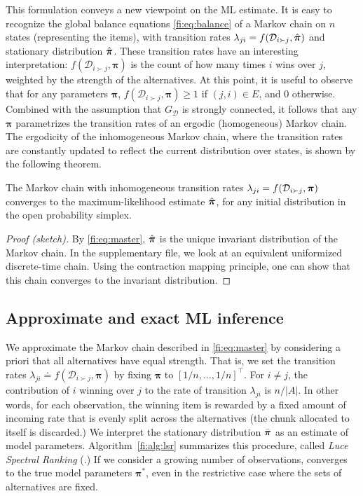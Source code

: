 This formulation conveys a new viewpoint on the ML estimate.
It is easy to recognize the global balance equations \eqref{fi:eq:balance} of a Markov chain on $n$ states (representing the items), with transition rates $\lambda_{ji} = f(\mathcal{D}_{i \succ j}, \hat{\bm{\pi}})$ and stationary distribution $\hat{\bm{\pi}}$.
These transition rates have an interesting interpretation: $f(\mathcal{D}_{i \succ j}, \bm{\pi})$ is the count of how many times $i$ wins over $j$, weighted by the strength of the alternatives.
At this point, it is useful to observe that for any parameters $\bm{\pi}$, $f(\mathcal{D}_{i \succ j}, \bm{\pi}) \ge 1$ if $(j,i) \in E$, and $0$ otherwise.
Combined with the assumption that $G_\mathcal{D}$ is strongly connected, it follows that any $\bm{\pi}$ parametrizes the transition rates of an ergodic (homogeneous) Markov chain.
The ergodicity of the inhomogeneous Markov chain, where the transition rates are constantly updated to reflect the current distribution over states, is shown by the following theorem.
\begin{theorem}
\label{fi:thm:convergence}
The Markov chain with inhomogeneous transition rates $\lambda_{ji} = f(\mathcal{D}_{i \succ j}, \bm{\pi})$ converges to the maximum-likelihood estimate $\hat{\bm{\pi}}$, for any initial distribution in the open probability simplex.
\end{theorem}

\vspace{-0.3cm}
\begin{proof}[Proof (sketch)]
By \eqref{fi:eq:master}, $\hat{\bm{\pi}}$ is the unique invariant distribution of the Markov chain.
In the supplementary file, we look at an equivalent uniformized discrete-time chain.
Using the contraction mapping principle, one can show that this chain converges to the invariant distribution.
\end{proof}


\subsection{Approximate and exact ML inference}

We approximate the Markov chain described in \eqref{fi:eq:master} by considering a priori that all alternatives have equal strength.
That is, we set the transition rates $\lambda_{ji} \doteq f(\mathcal{D}_{i \succ j}, \bm{\pi})$ by fixing $\bm{\pi}$ to $[1/n, \ldots, 1/n]^\intercal$.
For $i \ne j$, the contribution of $i$ winning over $j$ to the rate of transition $\lambda_{ji}$ is $n / |A|$.
In other words, for each observation, the winning item is rewarded by a fixed amount of incoming rate that is evenly split across the alternatives (the chunk allocated to itself is discarded.)
We interpret the stationary distribution $\bar{\bm{\pi}}$ as an estimate of model parameters.
Algorithm~\ref{fi:alg:lsr} summarizes this procedure, called \emph{Luce Spectral Ranking} (\LSR{}.)
If we consider a growing number of observations, \LSR{} converges to the true model parameters $\bm{\pi}^*$, even in the restrictive case where the sets of alternatives are fixed.

